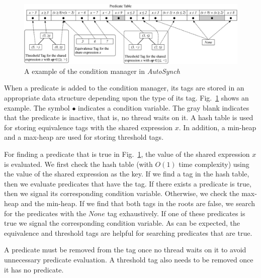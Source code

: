 \documentclass[preprint]{sigplanconf}
\newtheorem{definition}{Definition}
\begin{document}
\begin{figure}[ht!]
  \centering
  \includegraphics[width=180mm]{fig/manager.eps}
  \caption{A example of the condition manager in {\em AutoSynch}}
  \label{fig:mgr}
\end{figure}


When a predicate is added to the condition manager, 
its tags are stored in an appropriate data structure depending upon the type of its tag.
Fig.~\ref{fig:mgr} shows an example. The symbol $\bullet$ indicates 
a condition variable. The gray blank indicates that the predicate is inactive,
that is, no thread waits on it. A hash table is used for
storing equivalence tags with the shared expression $x$. In addition, 
a min-heap and a max-heap are used for storing threshold tags. 



For finding a predicate that is true in Fig.~\ref{fig:mgr}, the value of the
shared expression $x$ is evaluated. We first check the hash table 
(with $O(1)$ time complexity) using the value of the shared expression as the
key. If we find a tag in the hash table, then we evaluate predicates that have
the tag. If there exists a predicate is true, then we signal its corresponding 
condition 
variable. Otherwise, we check the max-heap and the min-heap. If we find that 
both tags in the roots are false, we search for the predicates with the $None$ 
tag exhaustively. If one of these predicates is true
we signal the corresponding condition variable. As can
be expected, the equivalence and threshold tags are helpful for searching 
predicates that are true.   

A predicate must be removed from the tag once no thread waits on 
it to avoid unnecessary predicate evaluation. A threshold tag also needs to be
removed once it has no predicate. 
\end{document}
